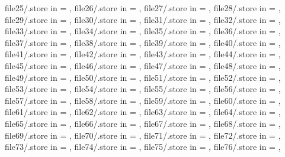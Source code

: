 {    file25/.store in         = \analogPlotFileAZ,
    file26/.store in         = \analogPlotFileBA,
    file27/.store in         = \analogPlotFileBB,
    file28/.store in         = \analogPlotFileBC,
    file29/.store in         = \analogPlotFileBD,
    file30/.store in         = \analogPlotFileBE,
    file31/.store in         = \analogPlotFileBF,
    file32/.store in         = \analogPlotFileBG,
    file33/.store in         = \analogPlotFileBH,
    file34/.store in         = \analogPlotFileBI,
    file35/.store in         = \analogPlotFileBJ,
    file36/.store in         = \analogPlotFileBK,
    file37/.store in         = \analogPlotFileBL,
    file38/.store in         = \analogPlotFileBM,
    file39/.store in         = \analogPlotFileBN,
    file40/.store in         = \analogPlotFileBO,
    file41/.store in         = \analogPlotFileBP,
    file42/.store in         = \analogPlotFileBQ,
    file43/.store in         = \analogPlotFileBR,
    file44/.store in         = \analogPlotFileBS,
    file45/.store in         = \analogPlotFileBT,
    file46/.store in         = \analogPlotFileBU,
    file47/.store in         = \analogPlotFileBV,
    file48/.store in         = \analogPlotFileBW,
    file49/.store in         = \analogPlotFileBX,
    file50/.store in         = \analogPlotFileBY,
    file51/.store in         = \analogPlotFileBZ,
    file52/.store in         = \analogPlotFileCA,
    file53/.store in         = \analogPlotFileCB,
    file54/.store in         = \analogPlotFileCC,
    file55/.store in         = \analogPlotFileCD,
    file56/.store in         = \analogPlotFileCE,
    file57/.store in         = \analogPlotFileCF,
    file58/.store in         = \analogPlotFileCG,
    file59/.store in         = \analogPlotFileCH,
    file60/.store in         = \analogPlotFileCI,
    file61/.store in         = \analogPlotFileCJ,
    file62/.store in         = \analogPlotFileCK,
    file63/.store in         = \analogPlotFileCL,
    file64/.store in         = \analogPlotFileCM,
    file65/.store in         = \analogPlotFileCN,
    file66/.store in         = \analogPlotFileCO,
    file67/.store in         = \analogPlotFileCP,
    file68/.store in         = \analogPlotFileCQ,
    file69/.store in         = \analogPlotFileCR,
    file70/.store in         = \analogPlotFileCS,
    file71/.store in         = \analogPlotFileCT,
    file72/.store in         = \analogPlotFileCU,
    file73/.store in         = \analogPlotFileCV,
    file74/.store in         = \analogPlotFileCW,
    file75/.store in         = \analogPlotFileCX,
    file76/.store in         = \analogPlotFileCY,
}
